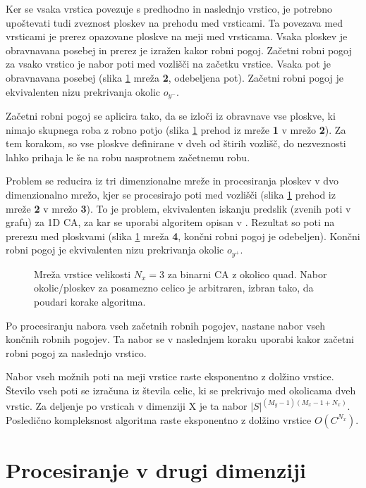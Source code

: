 \documentclass[12pt,a4paper,openany,twoside]{book}
\begin{document}
Ker se vsaka vrstica povezuje s predhodno in naslednjo vrstico, je potrebno
upoštevati tudi zveznost ploskev na prehodu med vrsticami.
Ta povezava med vrsticami je prerez opazovane ploskve na meji med vrsticama.
Vsaka ploskev je obravnavana posebej in prerez je izražen kakor robni pogoj.
Začetni robni pogoj za vsako vrstico je nabor poti med vozlišči na začetku vrstice.
Vsaka pot je obravnavana posebej (slika \ref{algorithm_line} mreža \textbf{2}, odebeljena pot).
Začetni robni pogoj je ekvivalenten nizu prekrivanja okolic \(o_{y^-}\).

Začetni robni pogoj se aplicira tako, da se izloči iz obravnave vse ploskve,
ki nimajo skupnega roba z robno potjo (slika \ref{algorithm_line}
prehod iz mreže \textbf{1} v mrežo \textbf{2}). Za tem korakom, so vse ploskve definirane
v dveh od štirih vozlišč, do nezveznosti lahko prihaja le še na robu nasprotnem
začetnemu robu.

Problem se reducira iz tri dimenzionalne mreže in procesiranja ploskev v
dvo dimenzionalno mrežo, kjer se procesirajo poti med vozlišči (slika \ref{algorithm_line}
prehod iz mreže \textbf{2} v mrežo \textbf{3}). To je problem, ekvivalenten iskanju predslik
(zvenih poti v grafu) za 1D CA, za kar se uporabi algoritem opisan v \cite{JerasDobnikar2007}.
Rezultat so poti na prerezu med ploskvami (slika \ref{algorithm_line} mreža \textbf{4},
končni robni pogoj je odebeljen).
Končni robni pogoj je ekvivalenten nizu prekrivanja okolic \(o_{y^+}\).

\begin{figure}[htb]
\centerline{}
\caption[Algoritem procesiranja vrstice.]{Mreža vrstice velikosti \(N_x=3\) za binarni CA z okolico quad.
Nabor okolic/ploskev za posamezno celico je arbitraren, izbran tako, da poudari korake algoritma.}
\label{algorithm_line}
\end{figure}

Po procesiranju nabora vseh začetnih robnih pogojev, nastane nabor vseh končnih robnih pogojev.
Ta nabor se v naslednjem koraku uporabi kakor začetni robni pogoj za naslednjo vrstico.

Nabor vseh možnih poti na meji vrstice raste eksponentno z dolžino vrstice.
Število vseh poti se izračuna iz števila celic, ki se prekrivajo med okolicama dveh vrstic.
Za deljenje po vrsticah v dimenziji X je ta nabor \( |S|^{(M_y-1)(M_x-1+N_x)} \).
Posledično kompleksnost algoritma raste eksponentno z dolžino vrstice \(O(C^{N_x})\).

\section{Procesiranje v drugi dimenziji}
\end{document}
